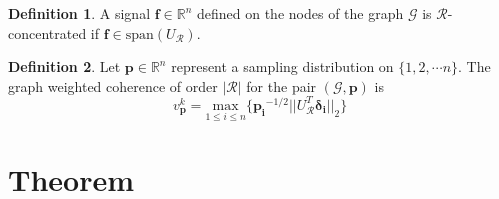 \documentclass[a4paper]{article}
\newcommand{\R}{\mathcal{R}}
\newcommand{\RR}{\mathbb{R}}
\newcommand{\G}{\mathcal{G}}
\newcommand{\vv}{\mathit{v}}
\theoremstyle{definition}
\newtheorem*{definition}{Definition}
\begin{document}
\begin{definition}
A signal $\bm{f} \in \RR^n$ defined on the nodes of the graph $\G$ is $\R$-concentrated if $\bm{f} \in \text{span}(U_{\R})$.
\end{definition}

\begin{definition}
Let $\bm{p} \in \RR^{n}$ represent a sampling distribution on $\{1,2,\cdots n\}$. The graph weighted coherence of order $|\R| $ for the pair $(\G, \bm{p})$ is
$$ \vv^k_{\bm{p}} = \underset{1\leq i\leq n}{\text{ max }} \{\bm{p_i}^{-1/2} ||U_{\R}^T \bm{\delta_i} ||_2\}$$

\end{definition}

\section{Theorem}
\end{document}
